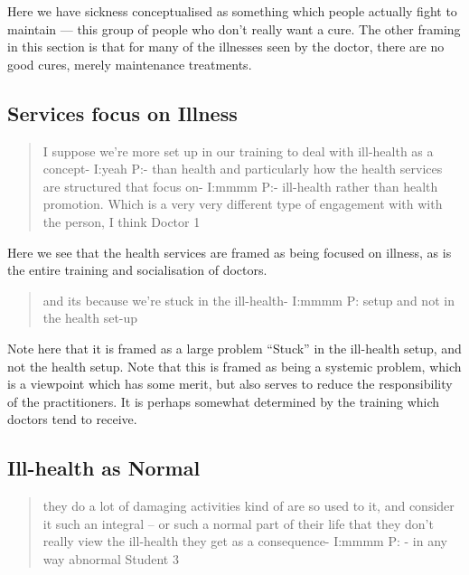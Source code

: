 Here we have sickness conceptualised as something which people actually fight to maintain --- this group of people who don't really want a cure. The other framing in this section is that for many of the illnesses seen by the doctor, there are no good cures, merely maintenance treatments. 


\subsection{Services focus on Illness}
\label{sec:serv-focus-illn}

\begin{quotation}
  I suppose we're more set up in our training to deal with ill-health as a concept-
I:yeah
P:- than health and particularly how the health services are structured that focus on-
I:mmmm
P:- ill-health rather than health promotion. Which is a very very different type of engagement with with the person, I think 
Doctor 1
\end{quotation}

Here we see that the health services are framed as being focused on illness, as is the entire training and socialisation of doctors. 

\begin{quotation}
   and its because we're stuck in the ill-health-
I:mmmm
P: setup and not in the health set-up

\end{quotation}

Note here that it is framed as a large problem ``Stuck'' in the ill-health setup, and not the health setup. Note that this is framed as being a systemic problem, which is a viewpoint which has some merit, but also serves to reduce the responsibility of the practitioners. It is perhaps somewhat determined by the training which doctors tend to receive. 

\subsection{Ill-health as Normal}
\label{sec:illhealth-as-normal}

\begin{quotation}
   they do a lot of damaging activities kind of are so used to it, and consider it such an integral – or such a normal part of their life that they don't really view the ill-health they get as a consequence-
I:mmmm
P: - in any way abnormal
Student 3
\end{quotation}


